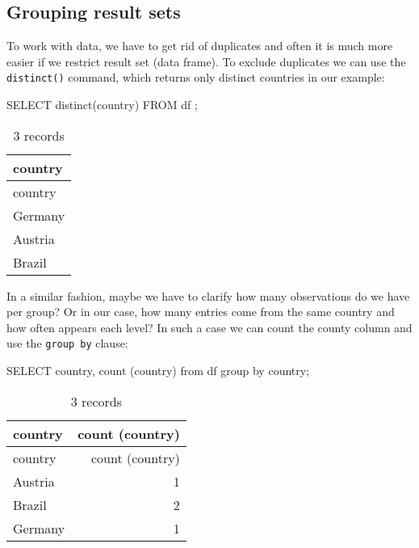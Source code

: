 \documentclass[
  letterpaper,
  DIV=11,
  numbers=noendperiod]{scrreprt}
\newenvironment{Shaded}{\begin{snugshade}}{\end{snugshade}}
\newcommand{\FunctionTok}[1]{\textcolor[rgb]{0.28,0.35,0.67}{#1}}
\newcommand{\KeywordTok}[1]{\textcolor[rgb]{0.00,0.23,0.31}{#1}}
\newcommand{\NormalTok}[1]{\textcolor[rgb]{0.00,0.23,0.31}{#1}}
\begin{document}
\hypertarget{grouping-result-sets}{%
\subsection{Grouping result sets}\label{grouping-result-sets}}

To work with data, we have to get rid of duplicates and often it is much
more easier if we restrict result set (data frame). To exclude
duplicates we can use the \texttt{distinct()} command, which returns
only distinct countries in our example:

\begin{Shaded}
\begin{Highlighting}[]
\KeywordTok{SELECT} \KeywordTok{distinct}\NormalTok{(country) }\KeywordTok{FROM}\NormalTok{ df ;}
\end{Highlighting}
\end{Shaded}

\begin{longtable}[]{@{}l@{}}
\caption{3 records}\tabularnewline
\toprule()
country \\
\midrule()
\endfirsthead
\toprule()
country \\
\midrule()
\endhead
Germany \\
Austria \\
Brazil \\
\bottomrule()
\end{longtable}

In a similar fashion, maybe we have to clarify how many observations do
we have per group? Or in our case, how many entries come from the same
country and how often appears each level? In such a case we can count
the county column and use the \texttt{group\ by} clause:

\begin{Shaded}
\begin{Highlighting}[]
\KeywordTok{SELECT}\NormalTok{ country, }\FunctionTok{count}\NormalTok{ (country) }\KeywordTok{from}\NormalTok{ df }\KeywordTok{group} \KeywordTok{by}\NormalTok{ country;}
\end{Highlighting}
\end{Shaded}

\begin{longtable}[]{@{}lr@{}}
\caption{3 records}\tabularnewline
\toprule()
country & count (country) \\
\midrule()
\endfirsthead
\toprule()
country & count (country) \\
\midrule()
\endhead
Austria & 1 \\
Brazil & 2 \\
Germany & 1 \\
\bottomrule()
\end{longtable}
\end{document}
